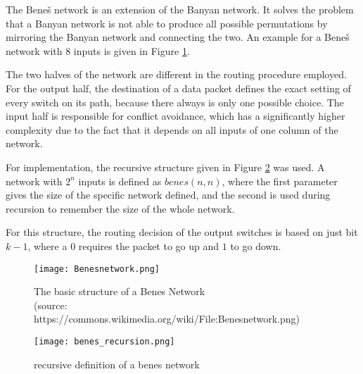 The Beneš network is an extension of the Banyan network.
It solves the problem that a Banyan network is not able to produce all possible permutations by mirroring the Banyan network and connecting the two.
An example for a Beneš network with 8 inputs is given in Figure \ref{fig:benes}.

The two halves of the network are different in the routing procedure employed.
For the output half, the destination of a data packet defines the exact setting of every switch on its path, because there always is only one possible choice.
The input half is responsible for conflict avoidance, which has a significantly higher complexity due to the fact that it depends on all inputs of one column of the network.

For implementation, the recursive structure given in Figure \ref{fig:benes_recursion} was used.
A network with $2^n$ inputs is defined as $benes(n, n)$, where the first parameter gives the size of the specific network defined, and the second is used during recursion to remember the size of the whole network.

For this structure, the routing decision of the output switches is based on just bit $k - 1$, where a $0$ requires the packet to go up and $1$ to go down.

\begin{figure}[!ht]
	\centering
	\texttt{[image: Benesnetwork.png]}
	\caption{
		The basic structure of a Benes Network \\
		(source: https://commons.wikimedia.org/wiki/File:Benesnetwork.png)
	}
	\label{fig:benes}
\end{figure}


\begin{figure}[!ht]
	\centering
	\texttt{[image: benes\_recursion.png]}
	\caption{recursive definition of a benes network}
	\label{fig:benes_recursion}
\end{figure}

